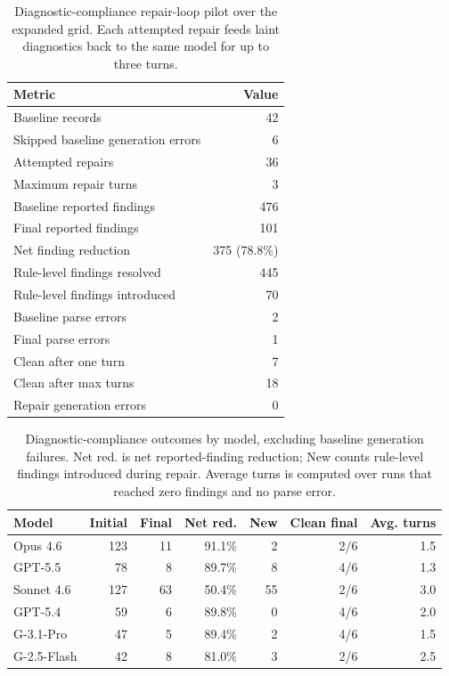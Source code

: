 
\begin{table}[ht]
  \centering
  \begin{tabular}{lr}
    \toprule
    Metric & Value \\
    \midrule
    Baseline records & 42 \\
    Skipped baseline generation errors & 6 \\
    Attempted repairs & 36 \\
    Maximum repair turns & 3 \\
    Baseline reported findings & 476 \\
    Final reported findings & 101 \\
    Net finding reduction & 375 (78.8\%) \\
    Rule-level findings resolved & 445 \\
    Rule-level findings introduced & 70 \\
    Baseline parse errors & 2 \\
    Final parse errors & 1 \\
    Clean after one turn & 7 \\
    Clean after max turns & 18 \\
    Repair generation errors & 0 \\
    \bottomrule
  \end{tabular}
  \caption{Diagnostic-compliance repair-loop pilot over the expanded grid. Each attempted repair feeds laint diagnostics back to the same model for up to three turns.}
  \label{tab:repair-summary}
\end{table}

\begin{table}[ht]
  \centering
  \scriptsize
  \begin{tabular}{lrrrrrr}
    \toprule
    Model & Initial & Final & Net red. & New & Clean final & Avg. turns \\
    \midrule
    Opus 4.6 & 123 & 11 & 91.1\% & 2 & 2/6 & 1.5 \\
    GPT-5.5 & 78 & 8 & 89.7\% & 8 & 4/6 & 1.3 \\
    Sonnet 4.6 & 127 & 63 & 50.4\% & 55 & 2/6 & 3.0 \\
    GPT-5.4 & 59 & 6 & 89.8\% & 0 & 4/6 & 2.0 \\
    G-3.1-Pro & 47 & 5 & 89.4\% & 2 & 4/6 & 1.5 \\
    G-2.5-Flash & 42 & 8 & 81.0\% & 3 & 2/6 & 2.5 \\
    \bottomrule
  \end{tabular}
  \caption{Diagnostic-compliance outcomes by model, excluding baseline generation failures. Net red. is net reported-finding reduction; New counts rule-level findings introduced during repair. Average turns is computed over runs that reached zero findings and no parse error.}
  \label{tab:repair-by-model}
\end{table}

